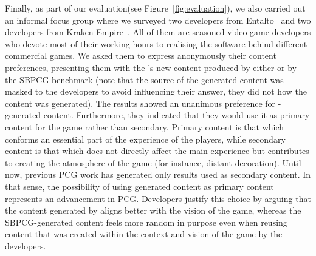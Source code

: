Finally, as part of our evaluation(see Figure~\ref{fig:evaluation}), we also carried out an informal focus group where we surveyed two developers from Entalto~\cite{entaltoweb} and two developers from Kraken Empire~\cite{krakenweb}. 
All of them are seasoned video game developers who devote most of their working hours to realising the software behind different commercial games. We asked them to express anonymously their content preferences, presenting them with the \CaseStudy's new content produced by either \ApproachName{} or by the SBPCG benchmark (note that the source of the generated content was masked to the developers to avoid influencing their answer, \ie they did not how the content was generated). The results showed an unanimous preference for \ApproachName{}-generated content.  Furthermore, they indicated that they would use it as primary content for the game rather than secondary. Primary content is that which conforms an essential part of the experience of the players, while secondary content is that which does not directly affect the main experience but contributes to creating the atmosphere of the game (for instance, distant decoration). Until now, previous PCG work has generated only results used as secondary content. In that sense, the possibility of using generated content as primary content represents an advancement in PCG. Developers justify this choice by arguing that the content generated by \ApproachName{} aligns better with the vision of the game, whereas the SBPCG-generated content feels more random in purpose even when reusing content that was created within the context and vision of the game by the developers.

